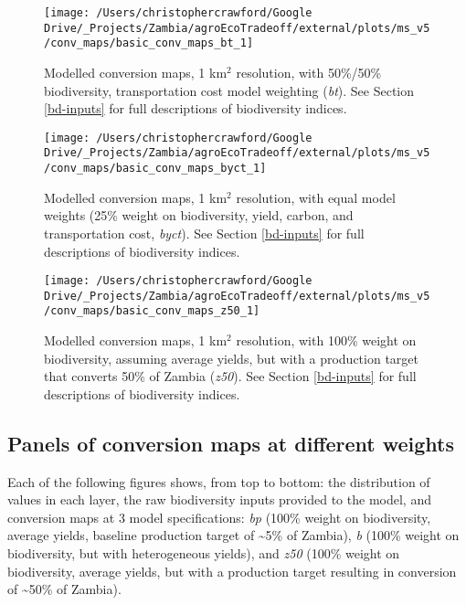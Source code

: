 \documentclass[
]{article}
\begin{document}
\begin{figure}
\texttt{[image: /Users/christophercrawford/Google Drive/\_Projects/Zambia/agroEcoTradeoff/external/plots/ms\_v5/conv\_maps/basic\_conv\_maps\_bt\_1]} \caption{Modelled conversion maps, 1 km\(^2\) resolution, with 50\%/50\% biodiversity, transportation cost model weighting (\emph{bt}). See Section \ref{bd-inputs} for full descriptions of biodiversity indices.}\label{fig:conv-maps-1-bt}
\end{figure}

\begin{figure}
\texttt{[image: /Users/christophercrawford/Google Drive/\_Projects/Zambia/agroEcoTradeoff/external/plots/ms\_v5/conv\_maps/basic\_conv\_maps\_byct\_1]} \caption{Modelled conversion maps, 1 km\(^2\) resolution, with equal model weights (25\% weight on biodiversity, yield, carbon, and transportation cost, \emph{byct}). See Section \ref{bd-inputs} for full descriptions of biodiversity indices.}\label{fig:conv-maps-1-byct}
\end{figure}

\begin{figure}
\texttt{[image: /Users/christophercrawford/Google Drive/\_Projects/Zambia/agroEcoTradeoff/external/plots/ms\_v5/conv\_maps/basic\_conv\_maps\_z50\_1]} \caption{Modelled conversion maps, 1 km\(^2\) resolution, with 100\% weight on biodiversity, assuming average yields, but with a production target that converts 50\% of Zambia (\emph{z50}). See Section \ref{bd-inputs} for full descriptions of biodiversity indices.}\label{fig:conv-maps-1-z50}
\end{figure}

\newpage

\hypertarget{panels-of-conversion-maps-at-different-weights}{%
\subsection{Panels of conversion maps at different weights}\label{panels-of-conversion-maps-at-different-weights}}

Each of the following figures shows, from top to bottom: the distribution of values in each layer, the raw biodiversity inputs provided to the model, and conversion maps at 3 model specifications: \emph{bp} (100\% weight on biodiversity, average yields, baseline production target of \textasciitilde5\% of Zambia), \emph{b} (100\% weight on biodiversity, but with heterogeneous yields), and \emph{z50} (100\% weight on biodiversity, average yields, but with a production target resulting in conversion of \textasciitilde50\% of Zambia).
\end{document}
